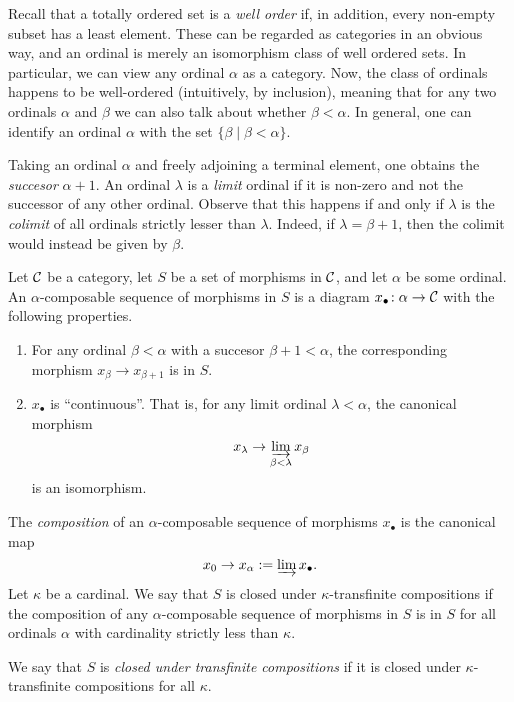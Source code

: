 Recall that a totally ordered set is a \emph{well order} if, in addition, every non-empty subset has a least element. These can be regarded as categories in an obvious way, and an
ordinal is merely an isomorphism class of well ordered sets. In particular, we can view any ordinal \(\alpha\) as a category. Now, the class of ordinals happens to be well-ordered (intuitively,
by inclusion), meaning that for any two ordinals \(\alpha\) and \(\beta\) we can also talk about whether \(\beta < \alpha\). In general, one can identify an ordinal \(\alpha\) with
the set \(\{ \beta \mid \beta < \alpha \}\).

Taking an ordinal \(\alpha\) and freely adjoining a terminal element, one obtains the \emph{succesor} \(\alpha+1\). An ordinal \(\lambda\) is a \emph{limit} ordinal if it is non-zero and
not the successor of any other ordinal. Observe that this happens if and only if \(\lambda\) is the \emph{colimit} of all ordinals strictly lesser than \(\lambda\). Indeed, if \(\lambda = \beta+1\), then
the colimit would instead be given by \(\beta\).

\begin{definition}
	Let \(\calC\) be a category, let \(S\) be a set of morphisms in \(\calC\), and let \(\alpha\) be some ordinal. An \(\alpha\)-composable sequence of morphisms in \(S\) is a
	diagram \(x_\bullet\!:\alpha \to \calC\) with the following properties.
	\begin{enumerate}[label=(\arabic*)]
		\item For any ordinal \(\beta < \alpha\) with a succesor \(\beta + 1 < \alpha\), the corresponding morphism \(x_{\beta} \to x_{\beta+1}\) is in \(S\).
		\item \(x_\bullet\) is ``continuous''. That is, for any limit ordinal \(\lambda < \alpha\), the canonical morphism
		\[ x_\lambda \to \injlim_{\beta < \lambda}x_\beta \]
		is an isomorphism.
	\end{enumerate}
	The \emph{composition} of an \(\alpha\)-composable sequence of morphisms \(x_\bullet\) is the canonical map
	\[ x_0 \to x_\alpha := \injlim x_\bullet. \]
	Let \(\kappa\) be a cardinal. We say that \(S\) is closed under \(\kappa\)-transfinite compositions if the composition of any \(\alpha\)-composable sequence of morphisms
	in \(S\) is in \(S\) for all ordinals \(\alpha\) with cardinality strictly less than \(\kappa\).

	We say that \(S\) is \emph{closed under transfinite compositions} if it is closed under \(\kappa\)-transfinite compositions for all \(\kappa\).
\end{definition}

